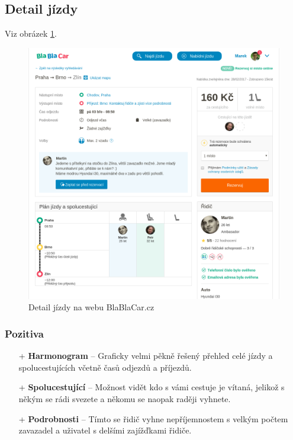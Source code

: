 
\newpage
\subsection{Detail jízdy}
Viz obrázek \ref{fig:blablacar:detail}.
\begin{figure}[h]
    \centering
    \includegraphics[width=1.0\textwidth]{media/blablacar/detail.png}
    \caption{Detail jízdy na webu BlaBlaCar.cz}
    \label{fig:blablacar:detail}
\end{figure}
\subsubsection*{Pozitiva}
\begin{itemize}
    \item[+] \textbf{Harmonogram} -- Graficky velmi pěkně řešený přehled celé jízdy a spolucestujících včetně časů odjezdů a příjezdů.
    \item[+] \textbf{Spolucestující} -- Možnost vidět kdo s vámi cestuje je vítaná, jelikož s někým se rádi svezete a někomu se naopak raději vyhnete.
    \item[+] \textbf{Podrobnosti} -- Tímto se řidič vyhne nepříjemnostem s velkým počtem zavazadel a uživatel s delšími zajížďkami řidiče.
\end{itemize}
